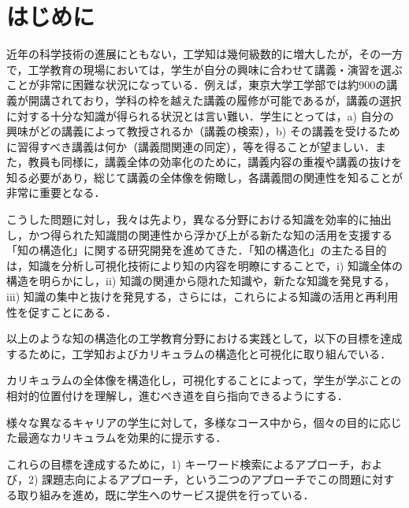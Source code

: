 \documentclass[japanese]{jnlp_1.4}
\begin{document}
\maketitle


\section{はじめに}

近年の科学技術の進展にともない，工学知は幾何級数的に増大したが，その一方で，工学教育の現場においては，学生が自分の興味に合わせて講義・演習を選ぶことが非常に困難な状況になっている．例えば，東京大学工学部では約900の講義が開講されており，学科の枠を越えた講義の履修が可能であるが，講義の選択に対する十分な知識が得られる状況とは言い難い．学生にとっては，a) 自分の興味がどの講義によって教授されるか（講義の検索），b) その講義を受けるために習得すべき講義は何か（講義間関連の同定），等を得ることが望ましい．また，教員も同様に，講義全体の効率化のために，講義内容の重複や講義の抜けを知る必要があり，総じて講義の全体像を俯瞰し，各講義間の関連性を知ることが非常に重要となる．

こうした問題に対し，我々は先より，異なる分野における知識を効率的に抽出し，かつ得られた知識間の関連性から浮かび上がる新たな知の活用を支援する「知の構造化」に関する研究開発を進めてきた\cite{Inproc_Mima_2006a,Article_Mima_2006b,Inproc_Yoshida_2007}．「知の構造化」の主たる目的は，知識を分析し可視化技術により知の内容を明瞭にすることで，i) 知識全体の構造を明らかにし，ii) 知識の関連から隠れた知識や，新たな知識を発見する，iii) 知識の集中と抜けを発見する，さらには，これらによる知識の活用と再利用性を促すことにある．

以上のような知の構造化の工学教育分野における実践として，以下の目標を達成するために，工学知およびカリキュラムの構造化と可視化に取り組んでいる．

\noindent
{}

カリキュラムの全体像を構造化し，可視化することによって，学生が学ぶことの相対的位置付けを理解し，進むべき道を自ら指向できるようにする．

\noindent
{}

様々な異なるキャリアの学生に対して，多様なコース中から，個々の目的に応じた最適なカリキュラムを効果的に提示する．

これらの目標を達成するために，1) キーワード検索によるアプローチ，および，2) 課題志向によるアプローチ，という二つのアプローチでこの問題に対する取り組みを進め，既に学生へのサービス提供を行っている．
\end{document}

